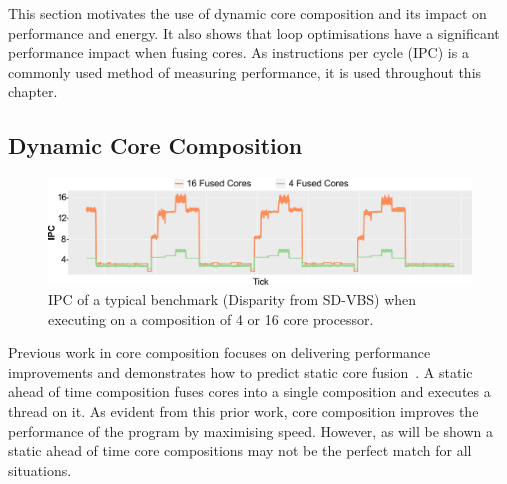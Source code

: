 This section motivates the use of dynamic core composition and its impact on performance and energy.
It also shows that loop optimisations have a significant performance impact when fusing cores.
As instructions per cycle (IPC) is a commonly used method of measuring performance, it is used throughout this chapter.

\subsection{Dynamic Core Composition}
\begin{figure}[t]
    \centering
    \includegraphics[width=\textwidth]{cases-paper/graphics/motivation/disp_opt_4_16_3.pdf}
    \caption{IPC of a typical benchmark (Disparity from SD-VBS) when executing on a composition of 4 or 16 core processor.} 
    \label{fig:disp_ex}
	\vspace{-2em}
\end{figure}





Previous work in core composition focuses on delivering performance improvements \cite{ipek2007CoreFusion,kim2007tflex} and demonstrates how to predict static core fusion~\cite{micolet2016dmpstream}.
A static ahead of time composition fuses cores into a single composition and executes a thread on it.
As evident from this prior work, core composition improves the performance of the program by maximising speed.
However, as will be shown a static ahead of time core compositions may not be the perfect match for all situations.

